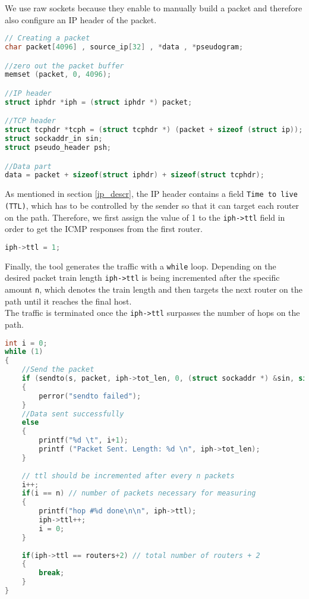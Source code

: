 We use raw sockets because they enable to manually build a packet and therefore also configure an IP header of the packet. 
\begin{lstlisting}[caption={Creation of a packet\cite{tcp_raw_sockets}}, language=C, showstringspaces=false]
// Creating a packet
char packet[4096] , source_ip[32] , *data , *pseudogram;

//zero out the packet buffer
memset (packet, 0, 4096);

//IP header
struct iphdr *iph = (struct iphdr *) packet;

//TCP header
struct tcphdr *tcph = (struct tcphdr *) (packet + sizeof (struct ip));
struct sockaddr_in sin;
struct pseudo_header psh;

//Data part
data = packet + sizeof(struct iphdr) + sizeof(struct tcphdr);
\end{lstlisting}

As mentioned in section \ref{ip_descr}, the IP header contains a field \texttt{Time to live (TTL)}, which has to be controlled by the sender so that it can target each router on the path. Therefore, we first assign the value of 1 to the \texttt{iph->ttl} field in order to get the ICMP responses from the first router. 

\begin{lstlisting}[language=C, showstringspaces=false]
iph->ttl = 1; 
\end{lstlisting}

Finally, the tool generates the traffic with a \texttt{while} loop. 
Depending on the desired packet train length \texttt{iph->ttl} is being incremented after the specific amount \texttt{n}, which denotes the train length and then targets the next router on the path until it reaches the final host.\\
The traffic is terminated once the  \texttt{iph->ttl} surpasses the number of hops on the path. 

\begin{lstlisting}[caption={Generating traffic towards the destination host}, language=C, showstringspaces=false, breaklines=true]
int i = 0;
while (1)
{
    //Send the packet
    if (sendto(s, packet, iph->tot_len, 0, (struct sockaddr *) &sin, sizeof(sin)) < 0)
    {
        perror("sendto failed");
    }
    //Data sent successfully
    else
    {
        printf("%d \t", i+1);
        printf ("Packet Sent. Length: %d \n", iph->tot_len);
    }
    
    // ttl should be incremented after every n packets
    i++;
    if(i == n) // number of packets necessary for measuring
    {
        printf("hop #%d done\n\n", iph->ttl);
        iph->ttl++;
        i = 0;
    }
    
    if(iph->ttl == routers+2) // total number of routers + 2
    {
        break;
    }
}
\end{lstlisting}


